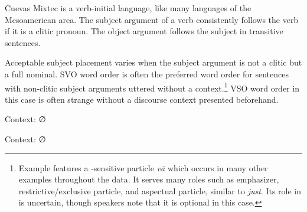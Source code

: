 \documentclass[output=paper,modfonts,nonflat]{langsci/langscibook}
\begin{document}
Cuevas Mixtec is a verb-initial language, like many languages of the Mesoamerican area.  The subject argument of a verb consistently follows the verb if it is a clitic pronoun.  The object argument follows the subject in transitive sentences.
 
\z 

\z 

Acceptable subject placement varies when the subject argument is not a clitic but a full nominal.  SVO word order is often the preferred word order for sentences with non-clitic subject arguments uttered without a  context.\footnote{Example  features a -sensitive particle \textit{v\=a} which occurs in many other examples throughout the data.  It serves many roles such as emphasizer, restrictive/exclusive particle, and aspectual particle, similar to  \textit{just}.  Its role in  is uncertain, though speakers note that it is optional in this case.}  VSO word order in this case is often strange without a discourse context presented beforehand.

\ea {}\label{ex:cisneros:18}
Context: ∅
\z 
\z

\ea {}\label{ex:cisneros:19}
Context: ∅
\end{document}
